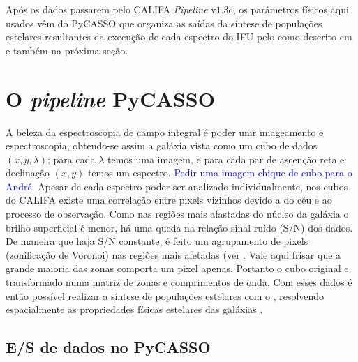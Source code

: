 Após os dados passarem pelo CALIFA {\em Pipeline} v$1.3$c, os parâmetros físicos
aqui usados vêm do PyCASSO que organiza as saídas da síntese de populações
estelares resultantes da execução de cada espectro do IFU pelo \starlight
\citep{CidFernandes2005} como descrito em \citet{CidFernandes2013a} e também na
próxima seção.


\section{O {\em pipeline} PyCASSO}
\label{sec:CALePyC:PyCASSO}

A beleza da espectroscopia de campo integral é poder unir imageamento e
espectroscopia, obtendo-se assim a galáxia vista como um cubo de dados  $(x, y,
\lambda)$; para cada $\lambda$ temos uma imagem, e para cada par de ascenção
reta e declinação $(x, y)$ temos um espectro. \ojo \textcolor{blue}{Pedir uma
imagem chique de cubo para o André.} Apesar de cada espectro poder ser analizado
individualmente, nos cubos do CALIFA existe uma correlação entre pixels vizinhos
devido a  do céu e ao processo de observação. Como nas regiões
mais afastadas do núcleo da galáxia o brilho superficial é menor, há uma queda
na relação sinal-ruído (S/N) dos dados. De maneira que haja S/N constante, é
feito um agrupamento de pixels (zonificação de Voronoi) nas regiões mais
afetadas (ver \citep[][sec. 3]{CidFernandes2013a}. Vale aqui frisar que a grande
maioria das zonas comporta um pixel apenas. Portanto o cubo original e
transformado numa matriz de zonas e comprimentos de onda. Com esses dados é
então possível realizar a síntese de populações estelares com o \starlight,
resolvendo espacialmente as propriedades físicas estelares das galáxias
\citep{CidFernandes2013a, CidFernandes2013b, GonzalezDelgado2013}.

\subsection{E/S de dados no PyCASSO}

